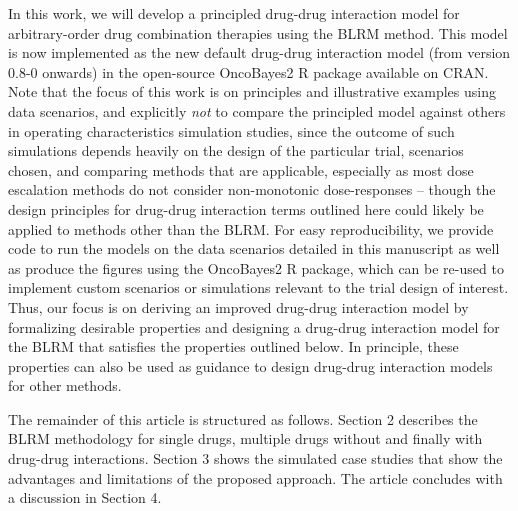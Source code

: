 \documentclass[AMA,STIX1COL]{WileyNJD-v2}
\newcommand{\revision}[1]{#1}
\begin{document}
In this work, we will develop a principled drug-drug interaction model \revision{for arbitrary-order drug combination therapies using the BLRM method}. This model is now implemented as the new default drug-drug interaction model (from version 0.8-0 onwards) in the open-source OncoBayes2\cite{OncoBayes2} R package available on CRAN. Note that the focus of this work is on principles and illustrative examples using data scenarios, and explicitly \emph{not} to compare the principled model against others in operating characteristics simulation studies, since the outcome of such simulations depends heavily on the design of the particular trial, scenarios chosen, and comparing methods that are applicable, \revision{especially as most dose escalation methods do not consider non-monotonic dose-responses -- though the design principles for drug-drug interaction terms outlined here could likely be applied to methods other than the BLRM. For easy reproducibility,} we provide code to run the models on the data scenarios detailed in this manuscript as well as produce the figures using the OncoBayes2 R package, which can be re-used to implement custom scenarios or simulations relevant to the trial design of interest. Thus, our focus is on deriving an improved drug-drug interaction model by formalizing desirable properties and designing a drug-drug interaction model for the BLRM that satisfies the properties outlined below. In principle, these properties can also be used as guidance to design drug-drug interaction models for other methods.

The remainder of this article is structured as follows. Section 2 describes the BLRM methodology for single drugs, multiple drugs without and finally with drug-drug interactions. Section 3 shows the simulated case studies that show the advantages and limitations of the proposed approach. The article concludes with a discussion in Section 4.
\end{document}
